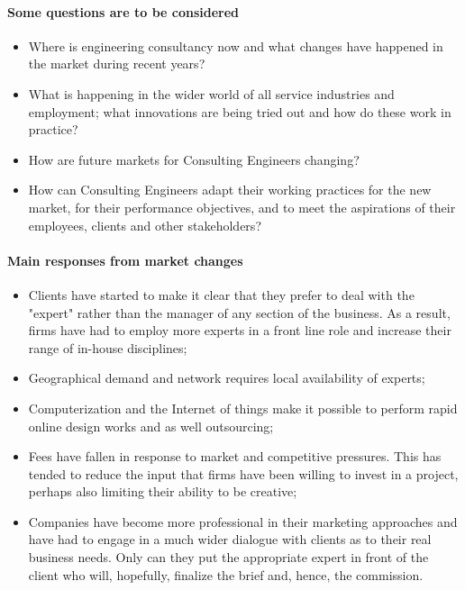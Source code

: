 \documentclass[a4paper,twoside,11pt]{article}
\begin{document}
\paragraph{Some questions are to be considered}
\begin{itemize}
\item Where is engineering consultancy now and what changes have happened in the market during recent years?
\item What is happening in the wider world of all service industries and employment; what innovations are being tried out and how do these work in practice?
\item How are future markets for Consulting Engineers changing?
\item How can Consulting Engineers adapt their working practices for the new market, for their performance objectives, and to meet the aspirations of their employees, clients and other stakeholders?
\end{itemize}

\paragraph{Main responses from market changes}
\begin{itemize}

\item Clients have started to make it clear that they prefer to deal with the "expert" rather than the manager of any section of the business. As a result, firms have had to employ more experts in a front line role and increase their range of in-house disciplines;

\item Geographical demand and network requires local availability of experts;

\item Computerization and the Internet of things make it possible to perform rapid online design works and as well outsourcing;

\item Fees have fallen in response to market and competitive pressures. This has tended to reduce the input that firms have been willing to invest in a project, perhaps also limiting their ability to be creative;

\item Companies have become more professional in their marketing approaches and have had to engage in a much wider dialogue with clients as to their real business needs. Only can they put the appropriate expert in front of the client who will, hopefully, finalize the brief and, hence, the commission.

\end{itemize}
\end{document}
